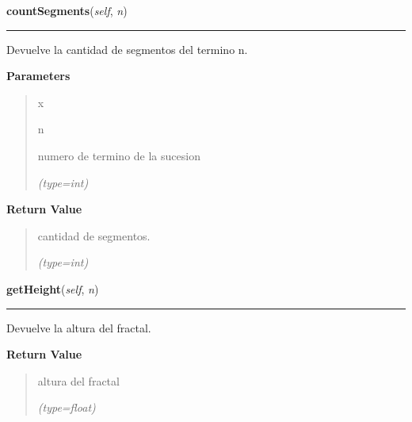 \hspace{.8\funcindent}\begin{boxedminipage}{\funcwidth}

    \raggedright \textbf{countSegments}(\textit{self}, \textit{n})

    \vspace{-1.5ex}

    \rule{\textwidth}{0.5\fboxrule}
\setlength{\parskip}{2ex}
    Devuelve la cantidad de segmentos del termino n.

\setlength{\parskip}{1ex}
      \textbf{Parameters}
      \vspace{-1ex}

      \begin{quote}
        \begin{Ventry}{x}

          \item[n]

          numero de termino de la sucesion

            {\it (type=int)}

        \end{Ventry}

      \end{quote}

      \textbf{Return Value}
    \vspace{-1ex}

      \begin{quote}
      cantidad de segmentos.

      {\it (type=int)}

      \end{quote}

    \end{boxedminipage}

    \label{FractalZE:koch:Koch:getHeight}

    \vspace{0.5ex}

\hspace{.8\funcindent}\begin{boxedminipage}{\funcwidth}

    \raggedright \textbf{getHeight}(\textit{self}, \textit{n})

    \vspace{-1.5ex}

    \rule{\textwidth}{0.5\fboxrule}
\setlength{\parskip}{2ex}
    Devuelve la altura del fractal.

\setlength{\parskip}{1ex}
      \textbf{Return Value}
    \vspace{-1ex}

      \begin{quote}
      altura del fractal

      {\it (type=float)}

      \end{quote}

    \end{boxedminipage}

